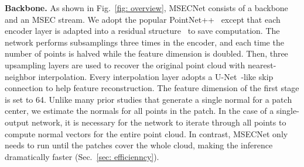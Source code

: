 \documentclass[sigconf]{acmart}
\begin{document}
\textbf{Backbone.}
As shown in Fig.~\ref{fig: overview}, MSECNet consists of a backbone and an MSEC stream. We adopt the popular PointNet++~\cite{qi2017pointnet++} except that each encoder layer is adapted into a residual structure~\cite{he2016deep} to save computation. The network performs subsamplings three times in the encoder, and each time the number of points is halved while the feature dimension is doubled. Then, three upsampling layers are used to recover the original point cloud with nearest-neighbor interpolation. Every interpolation layer adopts a U-Net~\cite{unet}-like skip connection to help feature reconstruction. The feature dimension of the first stage is set to 64. 
Unlike many prior studies that generate a single normal for a patch center, we estimate the normals for all points in the patch.
In the case of a single-output network, it is necessary for the network to iterate through all points to compute normal vectors for the entire point cloud. 
In contrast, MSECNet only needs to run until the patches cover the whole cloud, making the inference dramatically faster (Sec.~\ref{sec: efficienncy}). 

\indent 
\end{document}
